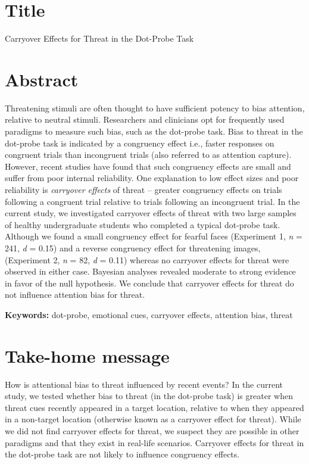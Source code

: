 \documentclass{article}
\begin{document}
  \section{Title}

Carryover Effects for Threat in the Dot-Probe Task



\section{Abstract}

Threatening stimuli are often thought to have sufficient potency to bias attention, relative to neutral stimuli. Researchers and clinicians opt for frequently used paradigms to measure such bias, such as the dot-probe task. Bias to threat in the dot-probe task is indicated by a congruency effect i.e., faster responses on congruent trials than incongruent trials (also referred to as attention capture). However, recent studies have found that such congruency effects are small and suffer from poor internal reliability. One explanation to low effect sizes and poor reliability is \emph{carryover effects} of threat -- greater congruency effects on trials following a congruent trial relative to trials following an incongruent trial. In the current study, we investigated carryover effects of threat with two large samples of healthy undergraduate students who completed a typical dot-probe task. Although we found a small congruency effect for fearful faces (Experiment 1, \emph{n} = 241, \emph{d }= 0.15) and a reverse congruency effect for threatening images, (Experiment 2, \emph{n }= 82, \emph{d }= 0.11) whereas no carryover effects for threat were observed in either case. Bayesian analyses revealed moderate to strong evidence in favor of the null hypothesis. We conclude that carryover effects for threat do not influence attention bias for threat. 



\textbf{Keywords:} dot-probe, emotional cues, carryover effects, attention bias, threat







\section{Take-home message}

How is attentional bias to threat influenced by recent events? In the current study, we tested whether bias to threat (in the dot-probe task) is greater when threat cues recently appeared in a target location, relative to when they appeared in a non-target location (otherwise known as a carryover effect for threat). While we did not find carryover effects for threat, we suspect they are possible in other paradigms and that they exist in real-life scenarios. Carryover effects for threat in the dot-probe task are not likely to influence congruency effects.
\end{document}
